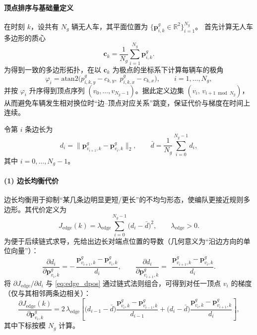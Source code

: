 \paragraph{顶点排序与基础量定义}
在时刻 \(k\)，设共有 \(N_g\) 辆无人车，其平面位置为
\(
\{\mathbf{p}^{g}_{i,k}\in\mathbb{R}^2\}_{i=1}^{N_g}
\)。
首先计算无人车多边形的质心
\begin{equation}
\label{eq:formation_centroid}
\mathbf{c}_k=\frac{1}{N_g}\sum_{i=1}^{N_g}\mathbf{p}^{g}_{i,k}.
\end{equation}
为得到一致的多边形拓扑，在以 \(\mathbf{c}_k\) 为极点的坐标系下计算每辆车的极角
\begin{equation}
\label{eq:formation_angle}
\varphi_i=\mathrm{atan2}\!\big(p^{g}_{i,k,y}-c_{k,y},\;p^{g}_{i,k,x}-c_{k,x}\big),\qquad i=1,\dots,N_g,
\end{equation}
并按 \(\varphi_i\) 升序得到顶点序列 \((v_0,\dots,v_{N_g-1})\)。据此定义边集
\(
(v_i,\,v_{i+1\bmod N_g})
\)，从而避免车辆发生相对换位时“边--顶点对应关系”跳变，保证代价与梯度在时间上连续。

令第 \(i\) 条边长为
\begin{equation}
\label{eq:edge_length}
d_i=\big\|\mathbf{p}^{g}_{v_{i+1},k}-\mathbf{p}^{g}_{v_i,k}\big\|_2,\qquad 
\bar d=\frac{1}{N_g}\sum_{i=0}^{N_g-1}d_i,
\end{equation}
其中 \(i=0,\dots,N_g-1\)。

\paragraph{(1) 边长均衡代价}
边长均衡用于抑制“某几条边明显更短/更长”的不均匀形态，使编队更接近规则多边形。其代价定义为
\begin{equation}
\label{eq:J_edge}
J_{\mathrm{edge}}(k)=\lambda_{\mathrm{edge}}\sum_{i=0}^{N_g-1}\big(d_i-\bar d\big)^2,\qquad \lambda_{\mathrm{edge}}>0.
\end{equation}
为便于后续链式求导，先给出边长对端点位置的导数（几何意义为“沿边方向的单位向量”）：
\begin{equation}
\label{eq:edge_dpos}
\frac{\partial d_i}{\partial \mathbf{p}^{g}_{v_i,k}}=-\,\frac{\mathbf{p}^{g}_{v_{i+1},k}-\mathbf{p}^{g}_{v_i,k}}{d_i},\qquad
\frac{\partial d_i}{\partial \mathbf{p}^{g}_{v_{i+1},k}}=\ \ \frac{\mathbf{p}^{g}_{v_{i+1},k}-\mathbf{p}^{g}_{v_i,k}}{d_i}.
\end{equation}
将 \(\partial J_{\mathrm{edge}}/\partial d_i\) 与 \eqref{eq:edge_dpos} 通过链式法则组合，可得到对任一顶点 \(v_i\) 的梯度（仅与其相邻两条边相关）：
\begin{equation}
\label{eq:J_edge_grad_pos}
\frac{\partial J_{\mathrm{edge}}(k)}{\partial \mathbf{p}^{g}_{v_i,k}}
=2\,\lambda_{\mathrm{edge}}\!\left[
\big(d_{i-1}-\bar d\big)\frac{\mathbf{p}^{g}_{v_i,k}-\mathbf{p}^{g}_{v_{i-1},k}}{d_{i-1}}
+\big(d_i-\bar d\big)\frac{\mathbf{p}^{g}_{v_i,k}-\mathbf{p}^{g}_{v_{i+1},k}}{d_i}
\right],
\end{equation}
其中下标按模 \(N_g\) 计算。

